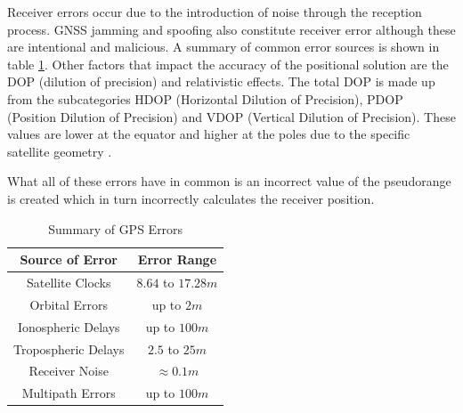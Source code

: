 Receiver errors occur due to the introduction of noise through the reception process. GNSS jamming and spoofing also constitute receiver error although these are
intentional and malicious. A summary of common error sources is shown in table \ref{tab:GPS Errors}.
Other factors that impact the accuracy of the positional solution are the DOP (dilution of precision) and relativistic effects. The total DOP is made up from the
subcategories HDOP (Horizontal Dilution of Precision), PDOP (Position Dilution of Precision) and VDOP (Vertical Dilution of Precision). These values are lower at the
equator and higher at the poles due to the specific satellite geometry \cite{RN62}.

What all of these errors have in common is an incorrect value of the pseudorange is created which in turn incorrectly calculates the receiver position.


\renewcommand{\arraystretch}{1.5}
\begin{table}
    \begin{center}
        \caption{Summary of GPS Errors}
        \label{tab:GPS Errors}
        \begin{tabular}{ c|c }
            \hline
            \textbf{Source of Error} & \textbf{Error Range} \\
            \hline
            Satellite Clocks & $8.64$ to $17.28m$\\
            Orbital Errors & up to $2m$\\
            Ionospheric Delays & up to $100m$\\
            Tropospheric Delays & $2.5$ to $25m$\\
            Receiver Noise & $\approx 0.1m$\\
            Multipath Errors & up to $100m$\\
            \hline
        \end{tabular}
    \end{center}
\end{table}
\renewcommand{\arraystretch}{1}


